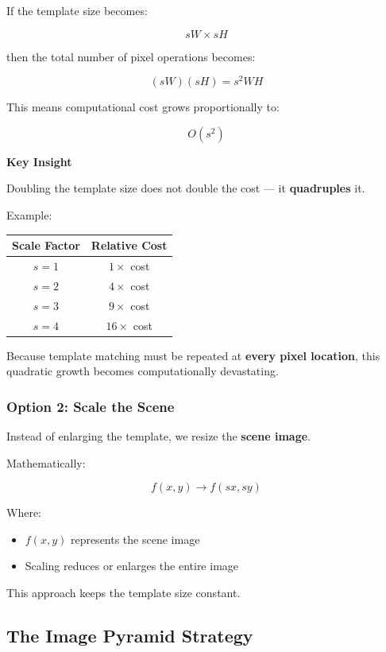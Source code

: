 \documentclass[12pt]{article}
\begin{document}
If the template size becomes:

\[
    sW \times sH
\]

then the total number of pixel operations becomes:

\[
    (sW)(sH) = s^2WH
\]

This means computational cost grows proportionally to:

\[
    O(s^2)
\]

\textbf{Key Insight}

Doubling the template size does not double the cost — it \textbf{quadruples} it.

Example:

\begin{center}
    \begin{tabular}{c|c}
        Scale Factor & Relative Cost    \\
        \hline
        $s=1$        & $1 \times$ cost  \\
        $s=2$        & $4 \times$ cost  \\
        $s=3$        & $9 \times$ cost  \\
        $s=4$        & $16 \times$ cost \\
    \end{tabular}
\end{center}

Because template matching must be repeated at \textbf{every pixel location}, this quadratic growth becomes computationally devastating.

\subsubsection{Option 2: Scale the Scene}

Instead of enlarging the template, we resize the \textbf{scene image}.

Mathematically:

\[
    f(x,y) \rightarrow f(sx, sy)
\]

Where:

\begin{itemize}
    \item $f(x,y)$ represents the scene image
    \item Scaling reduces or enlarges the entire image
\end{itemize}

This approach keeps the template size constant.

\subsection{The Image Pyramid Strategy}
\end{document}
